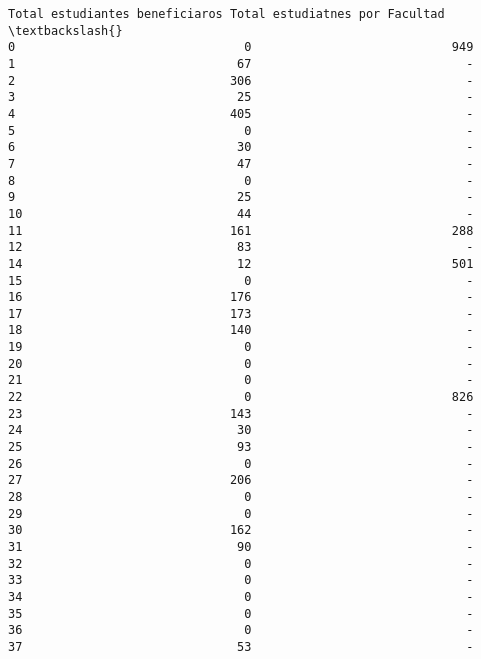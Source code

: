 \documentclass[11pt]{article}
\begin{document}
\begin{Verbatim}[commandchars=\\\{\}]
    Total estudiantes beneficiaros Total estudiatnes por Facultad  \textbackslash{}
0                                0                            949   
1                               67                              -   
2                              306                              -   
3                               25                              -   
4                              405                              -   
5                                0                              -   
6                               30                              -   
7                               47                              -   
8                                0                              -   
9                               25                              -   
10                              44                              -   
11                             161                            288   
12                              83                              -   
14                              12                            501   
15                               0                              -   
16                             176                              -   
17                             173                              -   
18                             140                              -   
19                               0                              -   
20                               0                              -   
21                               0                              -   
22                               0                            826   
23                             143                              -   
24                              30                              -   
25                              93                              -   
26                               0                              -   
27                             206                              -   
28                               0                              -   
29                               0                              -   
30                             162                              -   
31                              90                              -   
32                               0                              -   
33                               0                              -   
34                               0                              -   
35                               0                              -   
36                               0                              -   
37                              53                              -   

\end{Verbatim}
\end{document}
